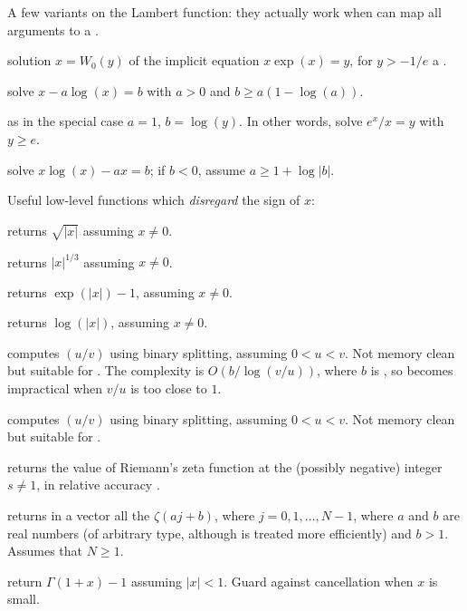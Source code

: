 \noindent A few variants on the Lambert function: they actually work when
 can map all  arguments to a .

 solution $x = W_0(y)$ of the implicit equation
$x \exp(x) = y$, for $y > -1/e$ a .

solve $x - a  \log(x) = b$ with $a > 0$ and $b \geq a (1 - \log(a))$.

 as 
in the special case $a = 1$, $b = \log(y)$. In other words,
solve $e^x / x = y$ with $y \geq e$.

solve $x  \log(x) - a  x = b$; if $b < 0$, assume $a \geq 1 + \log |b|$.

\noindent Useful low-level functions which \emph{disregard} the sign of $x$:

 returns $\sqrt{|x|}$ assuming $x\neq 0$.

 returns $|x|^{1/3}$ assuming $x\neq 0$.

 returns $\exp(|x|) - 1$, assuming $x \neq 0$.

 returns $\log(|x|)$, assuming $x \neq 0$.


 computes $(u/v)$
using binary splitting, assuming $0 < u < v$. Not memory clean but suitable
for . The complexity is $O(b / \log(v/u))$, where $b$ is
, so becomes impractical when $v/u$ is too close to
$1$.

 computes $(u/v)$
using binary splitting, assuming $0 < u < v$. Not memory clean but suitable
for .

 returns the value of Riemann's zeta
function at the (possibly negative) integer $s\neq 1$, in relative accuracy
.

 returns in a vector
all the $\zeta(aj + b)$, where $j = 0, 1, \dots, N-1$, where $a$ and $b$ are
real numbers (of arbitrary type, although  is treated more
efficiently) and $b > 1$. Assumes that $N \geq 1$.

 return $\Gamma(1+x) - 1$ assuming
$|x| < 1$. Guard against cancellation when $x$ is small.

